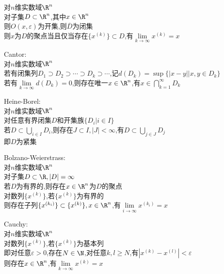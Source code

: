 \begin{dingli}
对$n$维实数域$\R^n$\\
对子集$D\subset \R^n$,其中$x\in \R^n$\\
则$O(x,\varepsilon)$为开集,则$\overline{D}$为闭集\\
则$x$为$D$的聚点当且仅当存在$\{x^{(k)}\}\subset D$,有$\lim\limits_{k\to\infty}x^{(k)}=x$
\end{dingli}

\begin{dingli}
Cantor:\\
对$n$维实数域$\R^n$\\
若有闭集列$D_1\supset D_2\supset\cdots\supset D_k\supset\cdots$,记$d(D_k)=\sup\{|x-y|\Big|x,y\in D_k\}$\\
若有$\lim\limits_{k\to\infty}d(D_k)=0$,则存在唯一$x\in \R^n$,有$x\in \bigcap\limits_{k=1}^{\infty}D_k$
\end{dingli}

\begin{dingli}
Heine-Borel:\\
对$n$维实数域$\R^n$\\
对任意有界闭集$D$和开集族$\{D_{i}|i\in I\}$\\
若$D\subset \bigcup\limits_{i\in I}D_{i}$,则存在$J\subset I,|J|<\infty$,有$D\subset \bigcup\limits_{j\in J}D_{j}$\\
即$D$为紧集
\end{dingli}

\begin{dingli}
Bolzano-Weierstrass:\\
对$n$维实数域$\R^n$\\
对子集$D\subset \R,|D|=\infty$\\
若$D$为有界的,则存在$x\in \R^n$为$D$的聚点\\
对数列$\{x^{(k)}\}$,若$\{x^{(k)}\}$为有界的\\
则存在子列$\{x^{(k_i)}\}\subset\{x^{(k)}\},x\in\R^n$,有$\lim\limits_{i\to\infty}x^{(k_{i})}=x$
\end{dingli}

\begin{dingli}
Cauchy:\\
对$n$维实数域$\R^n$\\
对数列$\{x^{(k)}\}$,若$\{x^{(k)}\}$为基本列\\
即对任意$\varepsilon>0$,存在$N\in \N$,对任意$k,l\geq N$,有$|x^{(k)}-x^{(l)}|<\varepsilon$\\
则存在$x\in \R^n$,有$\lim\limits_{k\to\infty}x^{(k)}=x$
\end{dingli}

